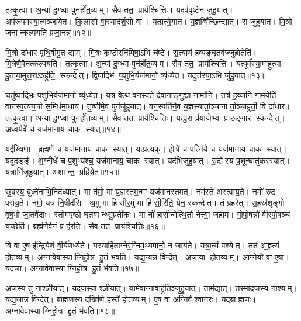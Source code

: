 तत्कृ॒त्वा। अ॒न्यां दु॒ग्ध्वा पुन॑र्\mbox{}होत॒व्यम्। सैव तत॒ प्राय॑श्चित्तिः। यदव॑वृष्टेन जुहु॒यात्। अप॑रूपमस्या॒त्मञ्जा॑येत। कि॒लासो॑ वा॒स्याद॑र्\mbox{}श॒सो वा। यत्प्रत्ये॒यात्। य॒ज्ञव्विँच्छि॑न्द्यात्। स जु॑हुयात्। मि॒त्रो जनान्कल्पयति प्रजा॒नन्न्॥१२॥

मि॒त्रो दा॑धार पृथि॒वीमु॒त द्याम्। मि॒त्रः कृ॒ष्टीरनि॑मिषा॒ऽभि च॑ष्टे। स॒त्याय॑ ह॒व्यङ्घृ॒तव॑ज्जुहो॒तेति॑। मि॒त्रेणै॒वैन॑त्कल्पयति। तत्कृ॒त्वा। अ॒न्यां दु॒ग्ध्वा पुन॑र्\mbox{}होत॒व्यम्। सैव तत॒ प्राय॑श्चित्तिः। यत्पूर्व॑स्या॒माहु॑त्या हु॒ताया॒मुत्त॒राऽऽहु॑ति॒ स्कन्देत्। द्वि॒पाद्भि॑ प॒शुभि॒र्यज॑मानो॒ व्यृ॑ध्येत। यदुत्त॑रया॒ऽभि जु॑हु॒यात्॥१३॥

चतु॑ष्पाद्भिः प॒शुभि॒र्यज॑मानो॒ व्यृ॑ध़्येत। यत्र॒ वेत्थ॑ वनस्पते दे॒वाना॒ङ्गुह्या॒ नामा॑नि। तत्र॑ ह॒व्यानि॑ गाम॒येति॑ वानस्प॒त्यय॒र्चा स॒मिध॑मा॒धाय॑। तू॒ष्णीमे॒व पुन॑र्जुहुयात्। वन॒स्पति॑नै॒व य॒ज्ञस्यार्ता॒ञ्चानार्ता॒ञ्चाहु॑ती॒ वि दा॑धार। तत्कृ॒त्वा। अ॒न्यां दु॒ग्ध्वा पुन॑र्\mbox{}होत॒व्यम्। सैव तत॒ प्राय॑श्चित्तिः। यत्पु॒रा प्र॑या॒जेभ्य॒ प्राङङ्गा॑र॒ स्कन्देत्। अ॒ध्व॒र्यवे॑ च॒ यज॑मानाय॒ चाक स्यात्॥१४॥

यद्द॑ख्षि॒णा। ब्र॒ह्मणे॑ च॒ यज॑मानाय॒ चाक स्यात्। यत्प्र॒त्यक्। होत्रे॑ च॒ पत्नि॑यै च॒ यज॑मानाय॒ चाक स्यात्। यदुदङ्ङ्॑। अ॒ग्नीधे॑ च प॒शुभ्य॑श्च॒ यज॑मानाय॒ चाक स्यात्। यद॑भिजुहु॒यात्। रु॒द्रोस्य प॒शून्घातु॑कस्स्यात्। यन्नाभि॑जुहु॒यात्। अशान्त॒ प्रह्रि॑येत॥१५॥

स्रु॒वस्य॒ बुध्ने॑नाभि॒निद॑ध्यात्। मा त॑मो॒ मा य॒ज्ञस्त॑म॒न्मा यज॑मानस्तमत्। नम॑स्ते अस्त्वाय॒ते। नमो॑ रुद्र पराय॒ते। नमो॒ यत्र॑ नि॒षीद॑सि। अ॒मुं मा हिसीर॒मुं मा हिसी॒रिति॒ येन॒ स्कन्देत्। तं प्रह॑रेत्। स॒हस्र॑शृङ्गो वृष॒भो जा॒तवे॑दाः। स्तोम॑पृष्ठो घृ॒तवान्थ्सु॒प्रती॑कः। मा नो॑ हासीन्मेत्थि॒तो नेत्त्वा॒ जहा॑म। गो॒पो॒षन्नो॑ वीरपो॒षञ्च॑ य॒च्छेति॑। ब्रह्म॑णै॒वैनं॒ प्र ह॑रति। सैव तत॒ प्राय॑श्चित्तिः॥१६॥

वि वा ए॒ष इ॑न्द्रि॒येण॑ वी॒र्ये॑णर्ध्यते। यस्याहि॑ताग्नेर॒ग्निर्म॒थ्यमा॑नो॒ न जाय॑ते। यत्रा॒न्यं पश्येत्। तत॑ आ॒हृत्य॑ होत॒व्यम्। अ॒ग्नावे॒वास्याग्निहो॒त्र हु॒तं भ॑वति। यद्य॒न्यन्न वि॒न्देत्। अ॒जाया होत॒व्यम्। आ॒ग्ने॒यी वा ए॒षा। यद॒जा। अ॒ग्नावे॒वास्याग्निहो॒त्र हु॒तं भ॑वति॥१७॥

अ॒जस्य॒ तु नाश्ञी॑यात्। यद॒जस्याश्ञी॒यात्। यामे॒वाग्नावाहु॑तिञ्जुहु॒यात्। ताम॑द्यात्। तस्मा॑द॒जस्य॒ नाश्यम्। यद्य॒जान्न वि॒न्देत्। ब्रा॒ह्म॒णस्य॒ दख्षि॑णे॒ हस्ते॑ होत॒व्यम्। ए॒ष वा अ॒ग्निर्वैश्वान॒रः। यद्ब्राह्म॒णः। अ॒ग्नावे॒वास्याग्निहो॒त्र हु॒तं भ॑वति॥१८॥

